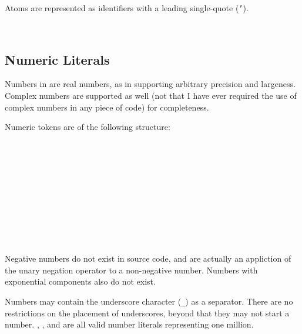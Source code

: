 Atoms are represented as identifiers with a leading single-quote (\texttt{'}).

\begin{bnf*}
     \\
\end{bnf*}

\subsection{Numeric Literals}

Numbers in \Trilogy{} are real numbers, as in supporting arbitrary
precision and largeness. Complex numbers are supported as well
(not that I have ever required the use of complex numbers in any
piece of code) for completeness.

Numeric tokens are of the following structure:

\begin{bnf*}
     \\
     \\
     \\
     \\
     \\
     \\
     \\
     \\
     \\
\end{bnf*}

Negative numbers do not exist in source code, and are actually
an appliction of the unary negation operator \op{-} to a non-negative number.
Numbers with exponential components also do not exist.

Numbers may contain the underscore character (\texttt{\_}) as a separator.
There are no restrictions on the placement of underscores, beyond that they
may not start a number. , , and
 are all valid number literals representing one
million.


